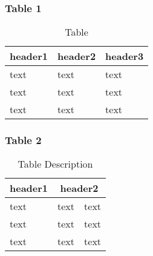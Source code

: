 \documentclass[xcolor=table]{beamer}
\begin{document}

\begin{frame}
\frametitle{Table 1}
\begin{table}
\begin{tabular}{l l l}
\toprule
\textbf{header1} & \textbf{header2} & \textbf{header3}\\
\midrule
text & text & text \\
text & text & text \\
text & text & text \\
\bottomrule
\end{tabular}
\caption{Table}
\end{table}
\end{frame}


\begin{frame}
\frametitle{Table 2}
\begin{table}[h]                        
\begin{center}		                    %
\begin{tabular}[c]{|l|c|r|}             %

\hline                           		%
\rowcolor{lightblue}
\textbf{header1} & \multicolumn{2}{c|}{\textbf{header2}}\\ %
\cline{2-3}
\hline \hline                           %
text & text & text\\          			%
\hline                                  %
text & text & text\\          			%
\hline                                  %
text & text & \cellcolor{yellow} text\\
\hline \hline                           %

\end{tabular}
\caption{Table Description}
\end{center}
\end{table}
\end{frame}
\end{document}
